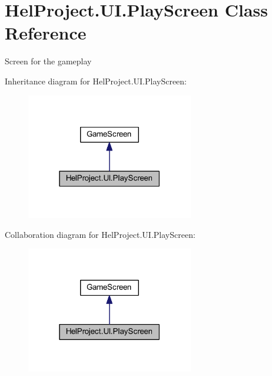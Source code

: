 \hypertarget{class_hel_project_1_1_u_i_1_1_play_screen}{}\section{Hel\+Project.\+U\+I.\+Play\+Screen Class Reference}
\label{class_hel_project_1_1_u_i_1_1_play_screen}


Screen for the gameplay  




Inheritance diagram for Hel\+Project.\+U\+I.\+Play\+Screen\+:\nopagebreak
\begin{figure}[H]
\begin{center}
\leavevmode
\includegraphics[width=207pt]{class_hel_project_1_1_u_i_1_1_play_screen__inherit__graph}
\end{center}
\end{figure}


Collaboration diagram for Hel\+Project.\+U\+I.\+Play\+Screen\+:\nopagebreak
\begin{figure}[H]
\begin{center}
\leavevmode
\includegraphics[width=207pt]{class_hel_project_1_1_u_i_1_1_play_screen__coll__graph}
\end{center}
\end{figure}
